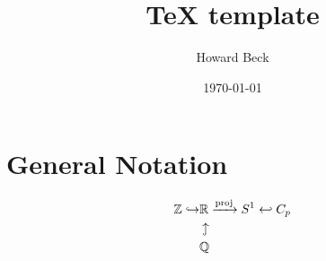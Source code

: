 \documentclass{amsart}
\title{TeX template}
\author{Howard Beck}
\date{\today}
\begin{document}
\maketitle

\section{General Notation}
\begin{align*}
\Z \incl &\R \tof{\mathrm{proj}} S^1 \incled C_p \\
& \inclUP \\
& \Q
\end{align*}
\end{document}
